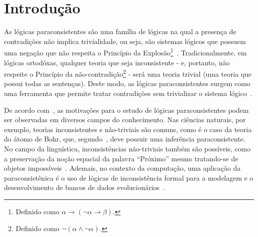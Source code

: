 \chapter{Introdução}

\noindent\label{cap:Introducao}
As lógicas paraconsistentes são uma família de lógicas na qual a presença de contradições não implica trivialidade, ou seja, são sistemas lógicos que possuem uma negação que não respeita o Princípio da Explosão\footnote{Definido como $\alpha \rightarrow (\neg \alpha \rightarrow \beta)$.}~\cite{carnielli2007}. Tradicionalmente, em lógicas ortodóxas, qualquer teoria que seja inconsistente {-} e, portanto, não respeite o Princípio da não-contradição\footnote{Definido como $\neg (\alpha \land \neg \alpha)$.} {-} será uma teoria trivial (uma teoria que possui todas as sentenças). Deste modo, as lógicas paraconsistentes surgem como uma ferramenta que permite tratar contradições sem trivializar o sistema lógico~\cite{Carnielli_Coniglio_2016}.

De acordo com~\cite{sep-logic-paraconsistent}, as motivações para o estudo de lógicas paraconsistentes podem ser observadas em diversos campos do conhecimento. Nas ciências naturais, por exemplo, teorias inconsistentes e não-triviais são comuns, como é o caso da teoria do átomo de Bohr, que, segundo~\cite{Brown2015-BROCAP-9}, deve possuir uma inferência paraconsistente. No campo da linguística, inconsistências não-triviais também são possíveis, como a preservação da noção espacial da palavra ``Próximo'' mesmo tratando-se de objetos impossíveis~\cite{McGinnis2013-MCGTUA}. Ademais, no contexto da computação, uma aplicação da paraconsistênica é o uso de lógicas de inconsistência formal para a modelagem e o desenvolvimento de bancos de dados evolucionários~\cite{carnielli2000formal}.

